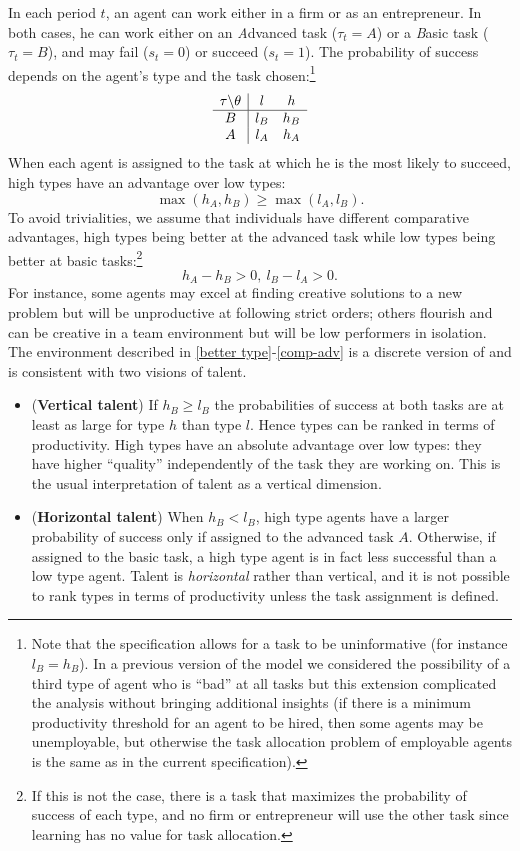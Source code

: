 \documentclass[12pt,american]{paper}
\theoremstyle{remark}
\begin{document}
In each period $t$, an agent can work either in a firm or as an entrepreneur. In both cases, he can work either on an \emph{A}dvanced task ($\tau_t=A$) or a \emph{B}asic task ($\tau_t=B$), and may fail ($s_t=0$) or succeed ($s_t=1$). The probability of success depends on the agent's type and the task chosen:\footnote{Note that the specification allows for a task to be uninformative (for instance $l_B=h_B$). In a previous version of the model we considered the possibility of a third type of agent who is ``bad'' at all tasks but this extension complicated the analysis without bringing additional insights (if there is a minimum productivity threshold for an agent to be hired, then some agents may be unemployable, but otherwise the task allocation problem of employable agents is the same as in the current specification).}
\[  
  \begin{array}{  c |c  c }
  \tau\backslash\theta & l & h \\
  \hline
 B & l_B & h_B \\
A & l_A & h_A 
\end{array}
\]
When each agent is assigned to the task at which he is the most likely to succeed, high types have an advantage over low types:
\begin{equation}\label{better type}
\max(h_A,h_B) \geq \max(l_A,l_B).
\end{equation}
To avoid trivialities, we assume that individuals have different comparative advantages, high types being better at the advanced task while low types being better at basic tasks:\footnote{%
If this is not the case, there is a task that maximizes the probability of success of each type, and no firm or entrepreneur will use the other task since learning has no value for task allocation.}
\begin{equation}\label{comp-adv}
h_A-h_B>0, ~  l_B-l_A>0.
\end{equation}
For instance, some agents may excel at finding creative solutions to a new problem but will be unproductive at following strict orders; others flourish and can be creative in a team environment but will be low performers in isolation. The environment described in \eqref{better type}-\eqref{comp-adv} is a discrete version of \cite{macdonald1982information,macdonald1982market} and is consistent with two visions of talent.
\begin{itemize}
\item(\textbf{Vertical talent}) If $h_B \geq l_B$ the probabilities of success at both tasks are at least as large for type $h$ than type $l$. Hence types can be ranked in terms of productivity. High types have  an absolute advantage over low types: they have higher ``quality'' independently of the task they are working on. This is the usual interpretation of talent as a vertical dimension.
\item (\textbf{Horizontal talent}) When $h_B<l_B$, high type agents have a larger probability of success only if assigned to the advanced task $A$. Otherwise, if assigned to the basic task, a high type agent is in fact less successful than a low type agent. Talent is \emph{horizontal} rather than vertical, and it is not possible to rank types in terms of productivity unless the task assignment is defined. 
\end{itemize}
\end{document}
